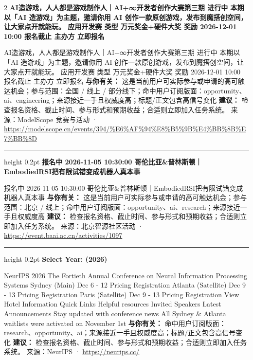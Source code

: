 \documentclass[10.5pt]{ctexart}
\begin{document}
\begin{multicols}{2}
{\large\bfseries AI造游戏，人人都是游戏制作人｜AI+∞开发者创作大赛第三期 进行中 本期以「AI 造游戏」为主题，邀请你用 AI 创作一款原创游戏，发布到魔搭创空间，让大家点开就能玩。 应用开发赛 类型 万元奖金+硬件大奖 奖励 2026-12-01 10:00 报名截止 主办方 立即报名}\par
AI造游戏，人人都是游戏制作人｜AI+∞开发者创作大赛第三期 进行中 本期以「AI 造游戏」为主题，邀请你用 AI 创作一款原创游戏，发布到魔搭创空间，让大家点开就能玩。 应用开发赛 类型 万元奖金+硬件大奖 奖励 2026-12-01 10:00 报名截止 主办方 立即报名
\textbf{与你有关：} 这是当前用户可实际参与或申请的高可触达机会；参与范围：全国 / 线上 / 部分线下；命中用户订阅版面：opportunity、ai、engineering；来源接近一手且权威度高；标题/正文包含高信号变化
\textbf{建议：} 检查报名资格、截止时间、参与形式和预期收益；合适则立即加入任务系统。
{\footnotesize\color{ormuted} 来源：ModelScope 竞赛与活动 · \url{https://modelscope.cn/events/394/%E6%AF%94%E8%B5%9B%E4%BB%8B%E7%BB%8D}}
\vspace{2mm}
\hrule height 0.2pt
\vspace{2mm}
{\large\bfseries 报名中 2026-11-05 10:30:00 哥伦比亚\&普林斯顿｜EmbodiedRSI把有限试错变成机器人真本事}\par
报名中 2026-11-05 10:30:00 哥伦比亚\&普林斯顿｜EmbodiedRSI把有限试错变成机器人真本事
\textbf{与你有关：} 这是当前用户可实际参与或申请的高可触达机会；参与范围：北京 / 线上；命中用户订阅版面：opportunity、ai、research；来源接近一手且权威度高
\textbf{建议：} 检查报名资格、截止时间、参与形式和预期收益；合适则立即加入任务系统。
{\footnotesize\color{ormuted} 来源：北京智源社区活动 · \url{https://event.baai.ac.cn/activities/1097}}
\vspace{2mm}
\hrule height 0.2pt
\vspace{2mm}
{\large\bfseries Select Year: (2026)}\par
NeurIPS 2026 The Fortieth Annual Conference on Neural Information Processing Systems Sydney (Main) Dec 6 - 12 Pricing Registration Atlanta (Satellite) Dec 9 - 13 Pricing Registration Paris (Satellite) Dec 9 - 13 Pricing Registration View Hotel Information Quick Links Helpful resources Invited Speakers Latest Announcements Stay updated with conference news All Sydney \& Atlanta waitlists were activated on November 1st 
\textbf{与你有关：} 命中用户订阅版面：research、opportunity、ai；来源接近一手且权威度高；标题/正文包含高信号变化
\textbf{建议：} 检查报名资格、截止时间、参与形式和预期收益；合适则立即加入任务系统。
{\footnotesize\color{ormuted} 来源：NeurIPS · \url{https://neurips.cc/}}

\end{multicols}
\end{document}
